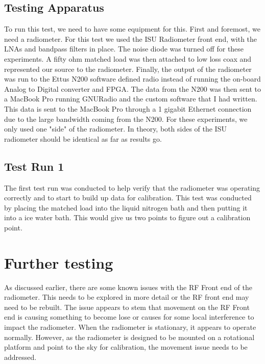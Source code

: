 \subsection{Testing Apparatus}
To run this test, we need to have some equipment for this.  First and foremost, we need a radiometer.  For this test we used the ISU Radiometer front end, with the LNAs and bandpass filters in place.  The noise diode was turned off for these experiments.  A fifty ohm matched load was then attached to low loss coax and represented our source to the radiometer.  Finally, the output of the radiometer was run to the Ettus N200 software defined radio instead of running the on-board Analog to Digital converter and FPGA.  The data from the N200 was then sent to a MacBook Pro running GNURadio and the custom software that I had written.  This data is sent to the MacBook Pro through a 1 gigabit Ethernet connection due to the large bandwidth coming from the N200.  For these experiments, we only used one "side" of the radiometer.  In theory, both sides of the ISU radiometer should be identical as far as results go.
\subsection{Test Run 1}
The first test run was conducted to help verify that the radiometer was operating correctly and to start to build up data for calibration.  This test was conducted by placing the matched load into the liquid nitrogen bath and then putting it into a ice water bath.  This would give us two points to figure out a calibration point.
\section{Further testing}
As discussed earlier, there are some known issues with the RF Front end of the radiometer.  This needs to be explored in more detail or the RF front end may need to be rebuilt.  The issue appears to stem that movement on the RF Front end is causing something to become lose or causes for some local interference to impact the radiometer.  When the radiometer is stationary, it appears to operate normally.  However, as the radiometer is designed to be mounted on a rotational platform and point to the sky for calibration, the movement issue needs to be addressed.  